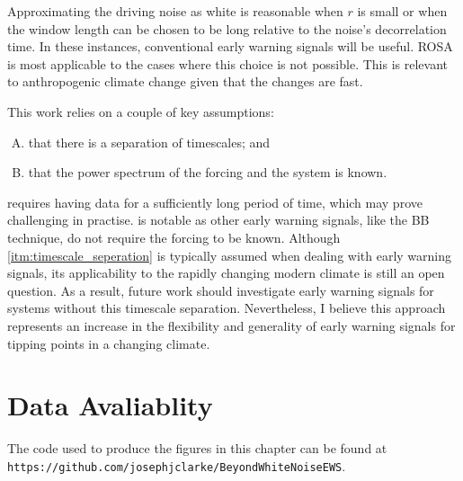 Approximating the driving noise as white is reasonable when $r$ is 
small or when the window length can be chosen to be long relative to the 
noise's decorrelation time. In these instances, conventional early warning signals will be useful. ROSA is most applicable to the cases where this choice is not
possible. This is relevant to anthropogenic climate change given that the changes are fast.

This work relies on a couple of  key assumptions:
\begin{enumerate}[A.]
\item \label{itm:timescale_seperation} that there is a separation of timescales; and
\item \label{itm:exists} that the power spectrum of the forcing and the system is known.
\end{enumerate}
 requires having data for a sufficiently long period of time, which may 
prove challenging in practise.  is notable as other early warning signals, like the BB technique, do not require the forcing to be known.
Although \cref{itm:timescale_seperation} is typically assumed when dealing with early warning signals, its applicability
to the rapidly changing modern climate is still an open question.
As a result, future work should investigate early warning signals for systems without this timescale separation.
Nevertheless, I believe this approach represents an increase in the flexibility and generality of early warning signals for tipping points in a changing climate.


\section*{Data Avaliablity}
The code used to produce the figures in this chapter can be found at \texttt{https://github.com/josephjclarke/BeyondWhiteNoiseEWS}.



